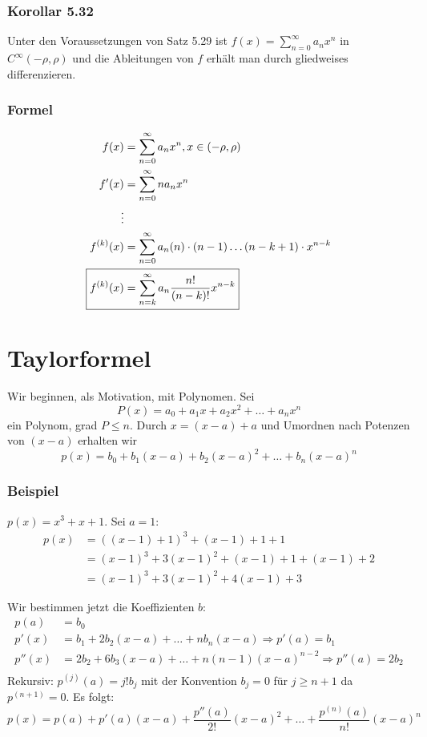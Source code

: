 \subsubsection*{Korollar 5.32}
Unter den Voraussetzungen von Satz 5.29 ist $f(x)=\sum\limits_{n=0}^\infty a_nx^n$ in $C^\infty\left( -\rho, \rho\right)$ und die Ableitungen von $f$ erhält man durch gliedweises differenzieren.
\subsubsection*{Formel}
\begin{align*}
f(x)&=\sum\limits_{n=0}^\infty a_nx^n, x\in\left( -\rho,\rho\right)\\
f'(x)&=\sum\limits_{n=0}^\infty na_nx^n\\
\vdots\\
f^{(k)}(x)&=\sum\limits_{n=0}^\infty a_n(n)\cdot(n-1)\dots(n-k+1)\cdot x^{n-k}\\
\Aboxed{f^{(k)}(x)&=\sum\limits_{n=k}^\infty a_n\frac{n!}{\left( n-k\right)!} x^{n-k}}
\end{align*}

\section{Taylorformel}
Wir beginnen, als Motivation, mit Polynomen. Sei
\[P(x)=a_0+a_1x+a_2x^2+\dots+a_nx^n\]
ein Polynom, grad $P\leq n$. Durch $x=(x-a)+a$ und Umordnen nach Potenzen von $(x-a)$ erhalten wir
\[p(x)=b_0+b_1(x-a)+b_2(x-a)^2+\dots+b_n(x-a)^n\]

\subsubsection*{Beispiel}
$p(x)=x^3+x+1$. Sei $a=1$:
\begin{align*}
p(x)&=\left( \left( x-1\right)+1\right)^3 +\left( x-1\right)+1+1\\
&=\left( x-1\right)^3+3\left( x-1\right)^2+\left( x-1\right)+1+\left( x-1\right)+2\\
&=\left( x-1\right)^3+3\left( x-1\right)^2+4\left( x-1\right)+3
\end{align*}

Wir bestimmen jetzt die Koeffizienten $b$:
\begin{align*}
p(a)&=b_0\\
p'(x)&=b_1+2b_2(x-a)+\dots+nb_n(x-a)\Rightarrow p'(a)=b_1\\
p''(x)&=2b_2+6b_3(x-a)+\dots+n(n-1)(x-a)^{n-2}\Rightarrow p''(a)=2b_2\\
\end{align*}
Rekursiv: $p^{(j)}(a)=j!b_j$ mit der Konvention $b_j=0$ für $j\geq n+1$ da $p^{(n+1)}=0$. Es folgt:
\[p(x)=p(a)+p'(a)(x-a)+\frac{p''(a)}{2!}(x-a)^2+\dots+\frac{p^{(n)}(a)}{n!}\left( x-a\right)^n\]

